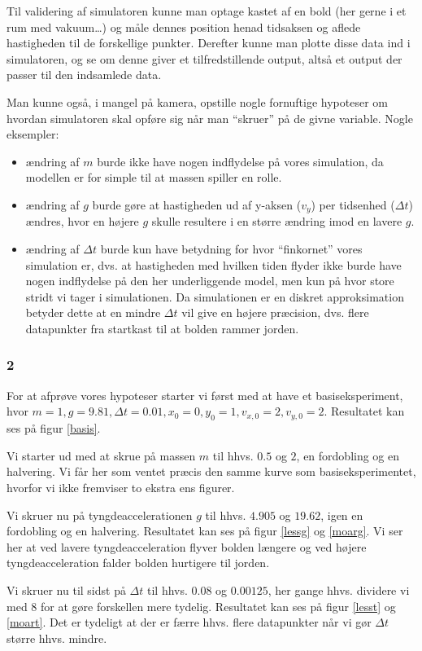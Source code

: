 Til validering af simulatoren kunne man optage kastet af en bold (her gerne i et rum med vakuum\ldots)
og måle dennes position henad tidsaksen og aflede hastigheden til de forskellige punkter.
Derefter kunne man plotte disse data ind i simulatoren, og se om denne giver et tilfredstillende output,
altså et output der passer til den indsamlede data.

Man kunne også, i mangel på kamera, opstille nogle fornuftige hypoteser om hvordan simulatoren skal
opføre sig når man ``skruer'' på de givne variable. Nogle eksempler:
\begin{itemize}
\item ændring af $m$ burde ikke have nogen indflydelse på vores simulation, da modellen er for simple
til at massen spiller en rolle.
\item ændring af $g$ burde gøre at hastigheden ud af y-aksen ($v_y$) per tidsenhed ($\Delta t$) ændres,
hvor en højere $g$ skulle resultere i en større ændring imod en lavere $g$.
\item ændring af $\Delta t$ burde kun have betydning for hvor ``finkornet'' vores simulation er, dvs.
at hastigheden med hvilken tiden flyder ikke burde have nogen indflydelse på den her underliggende
model, men kun på hvor store stridt vi tager i simulationen.
Da simulationen er en diskret approksimation betyder dette at en mindre $\Delta t$ vil give en højere
præcision, dvs. flere datapunkter fra startkast til at bolden rammer jorden.
\end{itemize} 
\subsubsection*{2}
For at afprøve vores hypoteser starter vi først med at have et basiseksperiment,
hvor $m = 1, g = 9.81, \Delta t = 0.01, x_0 = 0, y_0 = 1, v_{x,0} = 2, v_{y,0} = 2$.
Resultatet kan ses på figur \ref{basis}.

Vi starter ud med at skrue på massen $m$ til hhvs. $0.5$ og $2$, en fordobling og en halvering.
Vi får her som ventet præcis den samme kurve som basiseksperimentet, hvorfor vi ikke fremviser
to ekstra ens figurer.

Vi skruer nu på tyngdeaccelerationen $g$ til hhvs. $4.905$ og $19.62$, igen en fordobling og en halvering.
Resultatet kan ses på figur \ref{lessg} og \ref{moarg}.
Vi ser her at ved lavere tyngdeacceleration flyver bolden længere og ved højere tyngdeacceleration falder
bolden hurtigere til jorden.

Vi skruer nu til sidst på $\Delta t$ til hhvs. $0.08$ og $0.00125$, her gange hhvs. dividere vi med 8 for
at gøre forskellen mere tydelig.
Resultatet kan ses på figur \ref{lesst} og \ref{moart}.
Det er tydeligt at der er færre hhvs. flere datapunkter når vi gør $\Delta t$ større hhvs. mindre.

